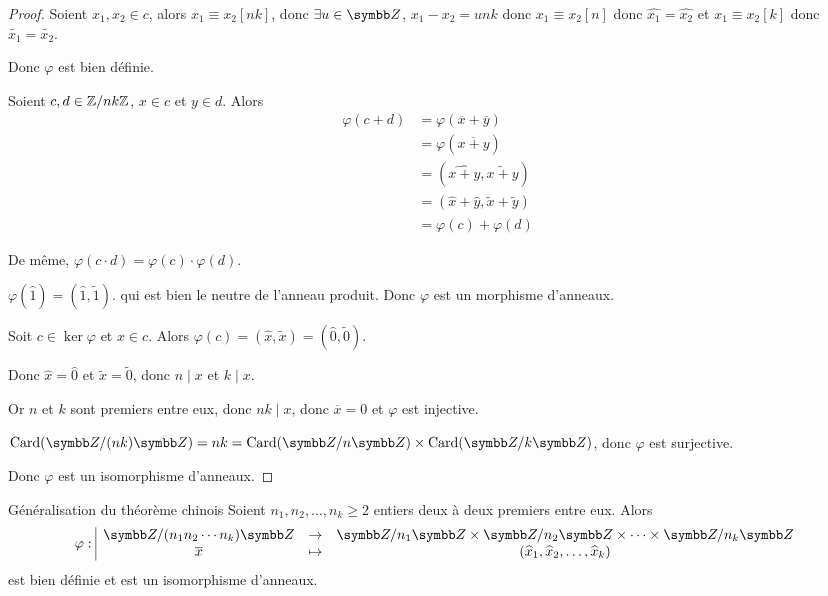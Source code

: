 \begin{proof}
    Soient $x_1, x_2 \in c$, alors $x_1 \equiv x_2 [nk]$, donc $\exists u \in \Z$, 
    $x_1 - x_2 = unk$ donc $x_1 \equiv x_2 [n]$ donc $\widehat{x_1} = \widehat{x_2}$ 
    et $x_1 \equiv x_2 [k]$ donc $\widetilde{x_1} = \widetilde{x_2}$.

    Donc $\varphi$ est bien définie.

    \avspace Soient $c, d \in \mathbb{Z}/nk\mathbb{Z}$, $x \in c$ et $y \in d$. Alors 
    \begin{align*}
        \varphi(c + d) & = \varphi(\overline x + \overline y) \\
        & = \varphi(\overline{x + y}) \\
        & = (\widehat{x + y}, \widetilde{x + y}) \\
        & = (\widehat x + \widehat y, \widetilde x + \widetilde y) \\
        & = \varphi(c) + \varphi(d)
    \end{align*}

    De même, $\varphi(c \cdot d) = \varphi(c) \cdot \varphi(d)$.

    $\varphi(\widehat 1) = (\widehat 1, \widetilde 1)$. qui est bien le neutre de l'anneau 
    produit. Donc $\varphi$ est un morphisme d'anneaux.

    \lvspace Soit $c \in \ker \varphi$ et $x \in c$. 
    Alors $\varphi(c) = (\widehat x, \widetilde x) = (\widehat 0, \widetilde 0)$.

    Donc $\widehat x = \widehat 0$ et $\widetilde x = \widetilde 0$, donc $n \mid x $ et $k \mid x$.

    Or $n$ et $k$ sont premiers entre eux, donc $nk \mid x$, donc $\overline x = 0$ et 
    $\varphi$ est injective.

    $\operatorname{Card}(\Z / (nk) \Z) = nk = \operatorname{Card}(\Z / n \Z) \times \operatorname{Card}(\Z / k \Z)$, donc
    $\varphi$ est surjective.

    Donc $\varphi$ est un isomorphisme d'anneaux.


\end{proof}

\begin{proposition}{Généralisation du théorème chinois}{}
    Soient $n_1, n_2, \ldots, n_k \geqslant 2$ entiers deux à deux premiers entre eux. 
    Alors \[\fonction{\varphi}{\Z / (n_1 n_2 \cdots n_k) \Z}{\Z / n_1 \Z \times \Z / n_2 \Z \times \cdots \times \Z / n_k \Z}{\overline x}{(\widehat x_1, \widehat x_2, \ldots, \widehat x_k)}\]
    est bien définie et est un isomorphisme d'anneaux.
\end{proposition}

